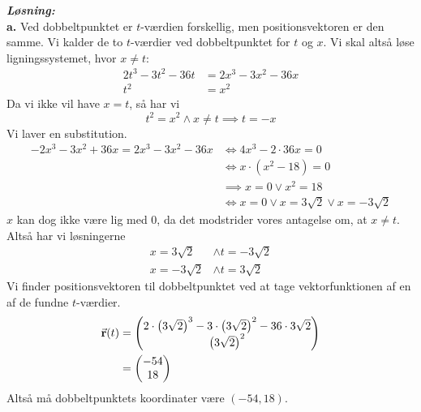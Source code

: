 \documentclass{article}
\newcommand{\sol}{\setlength{\parindent}{0cm}\textbf{\textit{Løsning:}}\setlength{\parindent}{1cm}}
\begin{document}
\sol \\
\textbf{a.} Ved dobbeltpunktet er $t$-værdien forskellig, men positionsvektoren er den samme.
Vi kalder de to $t$-værdier ved dobbeltpunktet for $t$ og $x$. 
Vi skal altså løse ligningssystemet, hvor $x\neq t$:
\begin{equation*}
\begin{split}
  2t^3-3t^2-36t&=2x^3-3x^2-36x \\
  t^2&=x^2
\end{split}
\end{equation*}
Da vi ikke vil have $x=t$, så har vi
\[
t^2=x^2 \land x\neq t \implies t=-x
\] 
Vi laver en substitution.
\begin{equation*}
\begin{split}
  -2x^3-3x^2+36 x=2x^3-3x^2-36x &\iff 4x^3-2 \cdot 36x=0\\ 
  &\iff x \cdot (x^2-18)=0 \\ 
  &\implies x=0 \lor x^2=18\\ 
  &\iff x=0 \lor x=3 \sqrt{2} \lor x=-3 \sqrt{2}
\end{split}
\end{equation*}
$x$ kan dog ikke være lig med 0, da det modstrider vores antagelse om, at $x\neq t$.
Altså har vi løsningerne
\begin{equation*}
\begin{split}
  x=3 \sqrt{2} &\land t=-3 \sqrt{2} \\ 
  x=-3 \sqrt{2} &\land t=3 \sqrt{2} 
\end{split}
\end{equation*}
Vi finder positionsvektoren til dobbeltpunktet ved at tage vektorfunktionen af en af de fundne $t$-værdier.
\begin{equation*}
\begin{split}
  \va{r}(t)&=\mqty(2 \cdot \left(3 \sqrt{2} \right)^3-3 \cdot \left(3 \sqrt{2} \right)^2 - 36 \cdot 3 \sqrt{2} \\ \left(3 \sqrt{2} \right)^2) \\
  &=\mqty(-54\\ 18) 
\end{split}
\end{equation*}
Altså må dobbeltpunktets koordinater være $(-54, 18)$.
\end{document}

